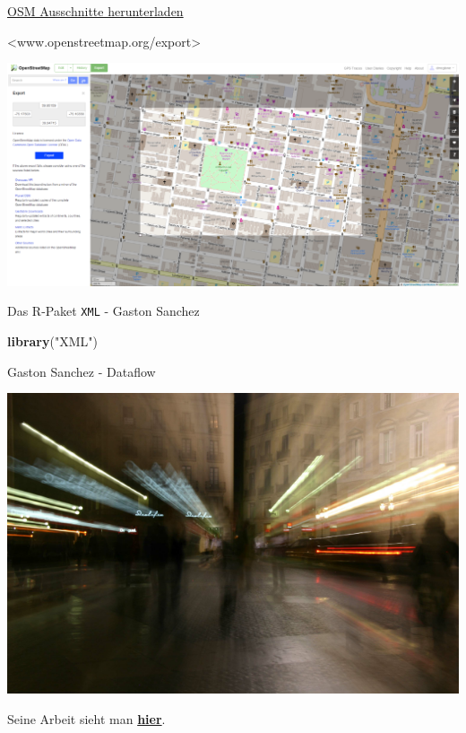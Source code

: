 \documentclass[ignorenonframetext,]{beamer}
\newenvironment{Shaded}{\begin{snugshade}}{\end{snugshade}}
\newcommand{\KeywordTok}[1]{\textcolor[rgb]{0.13,0.29,0.53}{\textbf{#1}}}
\newcommand{\StringTok}[1]{\textcolor[rgb]{0.31,0.60,0.02}{#1}}
\newcommand{\NormalTok}[1]{#1}
\begin{document}
\begin{frame}{\href{http://www.openstreetmap.org/export}{OSM Ausschnitte
herunterladen}}

\textless{}www.openstreetmap.org/export\textgreater{}

\includegraphics{figure/openstreetmap_export-1024x505.png}

\end{frame}

\begin{frame}[fragile]{Das R-Paket \texttt{XML} - Gaston Sanchez}

\begin{Shaded}
\begin{Highlighting}[]
\KeywordTok{library}\NormalTok{(}\StringTok{"XML"}\NormalTok{)}
\end{Highlighting}
\end{Shaded}

\begin{block}{Gaston Sanchez - Dataflow}

\includegraphics{figure/GastonSanchez2.png}

Seine Arbeit sieht man \href{http://gastonsanchez.com/}{\textbf{hier}}.

\end{block}

\end{frame}
\end{document}

